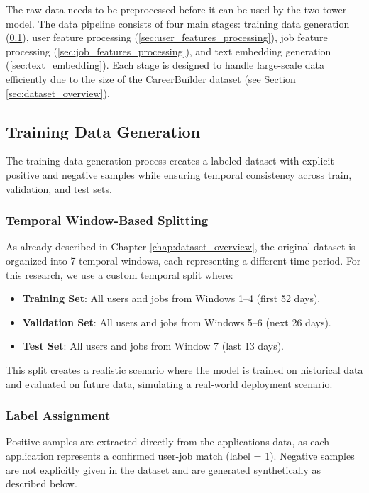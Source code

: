 The raw data needs to be preprocessed before it can be used by the two-tower model. The data pipeline consists of four main stages: training data generation (\ref{sec:training_data_gen}), user feature processing (\ref{sec:user_features_processing}), job feature processing (\ref{sec:job_features_processing}), and text embedding generation (\ref{sec:text_embedding}). Each stage is designed to handle large-scale data efficiently due to the size of the CareerBuilder dataset (see Section \ref{sec:dataset_overview}).

\subsection{Training Data Generation}
\label{sec:training_data_gen}

The training data generation process creates a labeled dataset with explicit positive and negative samples while ensuring temporal consistency across train, validation, and test sets.

\subsubsection{Temporal Window-Based Splitting}

As already described in Chapter \ref{chap:dataset_overview}, the original dataset is organized into 7 temporal windows, each representing a different time period. For this research, we use a custom temporal split where:
\begin{itemize}
    \item \textbf{Training Set}: All users and jobs from Windows 1--4 (first 52 days).
    \item \textbf{Validation Set}: All users and jobs from Windows 5--6 (next 26 days).
    \item \textbf{Test Set}: All users and jobs from Window 7 (last 13 days).
\end{itemize}

This split creates a realistic scenario where the model is trained on historical data and evaluated on future data, simulating a real-world deployment scenario.

\subsubsection{Label Assignment}

Positive samples are extracted directly from the applications data, as each application represents a confirmed user-job match (label = 1). Negative samples are not explicitly given in the dataset and are generated synthetically as described below.

